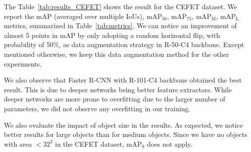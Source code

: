 The Table~\ref{tab:results_CEFET} shows the result for the CEFET dataset.
We report the mAP (averaged over multiple IoUs), mAP$_{50}$, mAP$_{75}$, mAP$_{\textrm{M}}$, mAP$_{\textrm{L}}$ metrics, summarized in Table~\ref{tab:metrics}.
We can notice an improvement of almost 5 points in mAP by only adopting a random horizontal flip, with probability of 50\%, as data augmentation strategy in R-50-C4 backbone.
Except mentioned otherwise, we keep this data augmentation method for the other experiments.
\begin{table}[b!]
\centering
\caption{Main results for CEFET dataset.}
\label{tab:results_CEFET}
\end{table}

We also observe that Faster R-CNN with R-101-C4 backbone obtained the best result.
This is due to deeper networks being better feature extractors.
While deeper networks are more prone to overfitting due to the larger number of parameters, we did not observe any overfitting in our training.

We also evaluate the impact of object size in the results.
As expected, we notice better results for large objects than for medium objects.
Since we have no objects with area $< 32^2$ in the CEFET dataset, mAP$_{\textrm{S}}$ does not apply.

